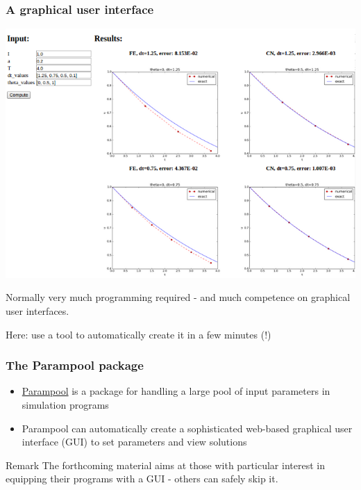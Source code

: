 \documentclass{beamer}
\begin{document}
\begin{frame}
\frametitle{A graphical user interface}

\centerline{\includegraphics[width=1.0\linewidth]{fig-softeng/web_GUI.png}}



Normally very much programming required - and much competence on
graphical user interfaces.

Here: use a tool to automatically create it in a few minutes (!)
\end{frame}

\begin{frame}
\frametitle{The Parampool package}

\begin{itemize}
 \item \href{{https://github.com/hplgit/parampool}}{Parampool} is a package
   for handling a large pool of input parameters in simulation programs

 \item Parampool can automatically create a sophisticated web-based
   graphical user interface (GUI) to set parameters and view solutions
\end{itemize}

\noindent
\begin{block}{Remark }
The forthcoming material aims at those with particular interest in
equipping their programs with a GUI - others can safely skip it.
\end{block}
\end{frame}
\end{document}
